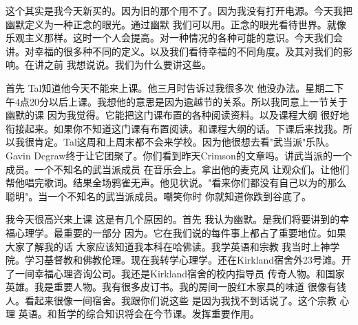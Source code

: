 这个其实是我今天新买的。因为旧的那个用不了。因为我没有打开电源。今天我把幽默定义为一种正念的眼光。通过幽默 我们可以用。正念的眼光看待世界。就像乐观主义那样。这时一个人会提高。对一种情况的各种可能的意识。今天我们会讲。对幸福的很多种不同的定义。以及我们看待幸福的不同角度。及其对我们的影响。在讲之前 我想说说。我们为什么要讲这些。 

首先 Tal知道他今天不能来上课。他三月时告诉过我很多次 他没办法。星期二下午4点20分以后上课。我想他的意思是因为逾越节的关系。所以我同意上一节关于幽默的课 因为我觉得。它能把这门课布置的各种阅读资料。以及课程大纲 很好地衔接起来。如果你不知道这门课有布置阅读。和课程大纲的话。下课后来找我。所以我很肯定。Tal这周和上周末都不会来学校。因为他很想去看"武当派"乐队。Gavin Degraw终于让它团聚了。你们看到昨天Crimson的文章吗。讲武当派的一个成员。一个不知名的武当派成员 在音乐会上。拿出他的麦克风 让观众们。让他们帮他唱完歌词。结果全场鸦雀无声。他见状说。"看来你们都没有自己以为的那么聪明"。当一个不知名的武当派成员。嘲笑你时 你就知道你跌到谷底了。 

我今天很高兴来上课 这是有几个原因的。首先 我认为幽默。是我们将要讲到的幸福心理学。最重要的一部分 因为。它在我们说的每件事上都占了重要地位。如果大家了解我的话 大家应该知道我本科在哈佛读。我学英语和宗教 我当时上神学院。学习基督教和佛教伦理。现在我转学心理学。还在Kirkland宿舍外23号滩。开了一间幸福心理咨询公司。我还是Kirkland宿舍的校内指导员 传奇人物。和国家英雄。我是重要人物。我有很多皮订书。我的房间一股红木家具的味道 很像有钱人。看起来很像一间宿舍。我跟你们说这些 是因为我找不到话说了。这个宗教 心理 英语。和哲学的综合知识将会在今节课。发挥重要作用。 


